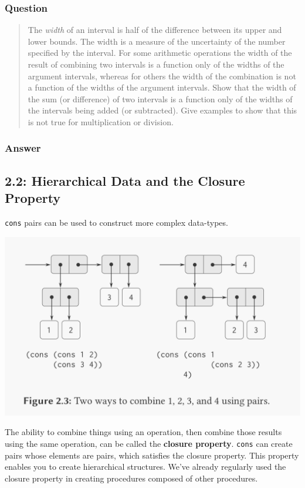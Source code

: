 \documentclass[final,fleqn,titlepage]{article}
\begin{document}
\subsubsection{Question}
\label{sec:orgae2160a}
\begin{quote}
The \emph{width} of an interval is half of the difference between its upper and lower
bounds. The width is a measure of the uncertainty of the number specified by the
interval. For some arithmetic operations the width of the result of combining
two intervals is a function only of the widths of the argument intervals,
whereas for others the width of the combination is not a function of the widths
of the argument intervals. Show that the width of the sum (or difference) of two
intervals is a function only of the widths of the intervals being added (or
subtracted). Give examples to show that this is not true for multiplication or
division.
\end{quote}
\subsubsection{Answer}
\label{sec:org7db03e4}

\subsection{2.2: Hierarchical Data and the Closure Property}
\label{sec:org2892c0f}
\texttt{cons} pairs can be used to construct more complex data-types.

\begin{center}
\includegraphics[width=.9\linewidth]{2/cons-cells.jpeg}
\end{center}

The ability to combine things using an operation, then combine those results
using the same operation, can be called the \textbf{closure property}. \texttt{cons} can
create pairs whose elements are pairs, which satisfies the closure property.
This property enables you to create hierarchical structures. We've already
regularly used the closure property in creating procedures composed of other
procedures.
\end{document}
